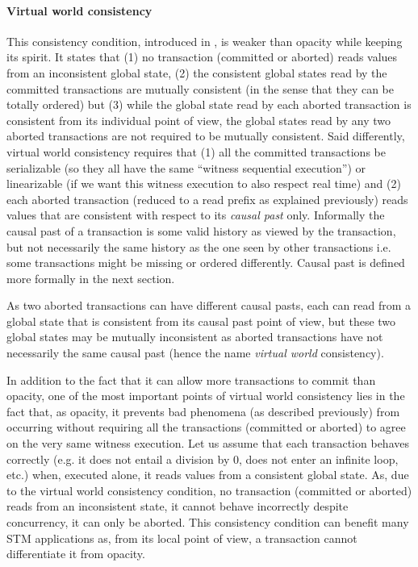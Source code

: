 \paragraph{Virtual world consistency}
This consistency condition, introduced in \cite{IR09},  is 
weaker  than  opacity while  keeping  its spirit.  It  states  that (1)  no
transaction (committed or aborted)  reads values from an inconsistent global
state, (2)  the consistent global states read by the committed transactions 
are   mutually consistent (in the sense that they can be totally  ordered)  
but    (3)  while the  global  state read  by each aborted transaction  is
consistent from its individual point  of view, the  global states read by
any two aborted  transactions are not  required to be  mutually consistent.  
%
Said differently, virtual world consistency requires  that  
(1)  all the   committed  transactions  be serializable \cite{P79} (so  
they all  have the same ``witness sequential execution'')  or linearizable 
\cite{HW90} (if we want  this witness  execution  to also respect real time) 
and (2)  each aborted transaction  (reduced  to a read  prefix as explained
previously) reads values that are  consistent  with respect to
its \emph{causal past} only.
Informally the causal past of a transaction is some valid history as viewed by
the transaction, but not necessarily the same history as the one seen by
other transactions i.e. some transactions might be missing or ordered differently.
Causal past is defined more formally in the next section.

As two aborted transactions can have different causal pasts, 
each can read from a  global state that is consistent from its causal past
point of view, but  these two global states may be mutually inconsistent 
as aborted transactions have not necessarily the same causal past  
(hence the name {\it virtual world} consistency).

In addition to the fact that  it can allow more transactions to commit than
opacity,  one of  the most important points  of virtual world  consistency lies 
in   the fact that,  as opacity, it  prevents  bad  phenomena  (as described 
previously)    from occurring  without requiring  all the
transactions  (committed   or  aborted)  to  agree on the very same  witness
execution.  Let  us  assume  that each  transaction  behaves  correctly
(e.g. it does not entail a division  by 0, does not enter an infinite loop,
etc.) when, executed  alone, it  reads  values from  a consistent  global
state.  As, due  to the virtual world consistency  condition, no transaction
(committed or aborted)  reads from an inconsistent state,  it cannot behave
incorrectly despite  concurrency, it can only  be aborted.
This  consistency 
condition  can benefit many  STM applications as, from  its  local point
of view,  a transaction cannot  differentiate it from opacity.


